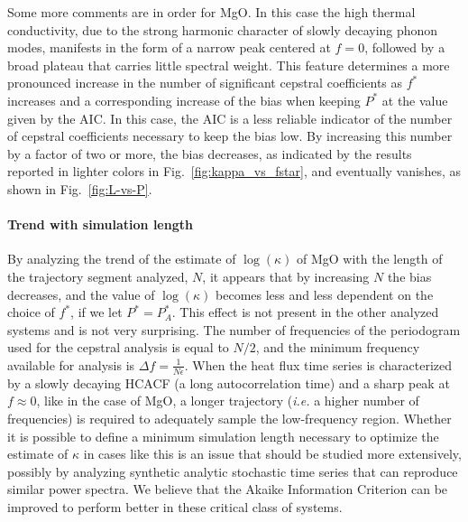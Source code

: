 Some more comments are in order for MgO. In this case the high thermal conductivity, due to the strong harmonic character of slowly decaying phonon modes, manifests in the form of a narrow peak centered at $f=0$, followed by a broad plateau that carries little spectral weight. This feature determines a more pronounced increase in the number of significant cepstral coefficients as $f^*$ increases and a corresponding increase of the bias when keeping $P^*$ at the value given by the AIC. In this case, the AIC is a less reliable indicator of the number of cepstral coefficients necessary to keep the bias low. By increasing this number by a factor of two or more, the bias decreases, as indicated by the results reported in lighter colors in Fig.~\ref{fig:kappa_vs_fstar}, and eventually vanishes, as shown in Fig.~\ref{fig:L-vs-P}.

\begin{LEtext}
\paragraph{Trend with simulation length}
By analyzing the trend of the estimate of $\log(\kappa)$ of MgO with the length of the trajectory segment analyzed, $N$, it appears that by increasing $N$ the bias decreases, and the value of $\log(\kappa)$ becomes less and less dependent on the choice of $f^*$, if we let $P^*=P_A^*$. This effect is not present in the other analyzed systems and is not very surprising. The number of frequencies of the periodogram used for the cepstral analysis is equal to $N/2$, and the minimum frequency available for analysis is $\Delta f = \frac{1}{N\epsilon}$. 
When the heat flux time series is characterized by a slowly decaying HCACF (a long autocorrelation time) and a sharp peak at $f\approx 0$, like in the case of MgO, a longer trajectory (\emph{i.e.} a higher number of frequencies) is required to adequately sample the low-frequency region. 
Whether it is possible to define a minimum simulation length necessary to optimize the estimate of $\kappa$ in cases like this is an issue that should be studied more extensively, possibly by analyzing synthetic analytic stochastic time series that can reproduce similar power spectra. 
We believe that the Akaike Information Criterion can be improved to perform better in these critical class of systems. 
\end{LEtext}


